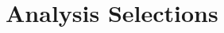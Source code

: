 \ifx\master\undefined\fi

\chapter{Analysis Selections}
\label{ch:selections}

\ifx\master\undefined\fi
